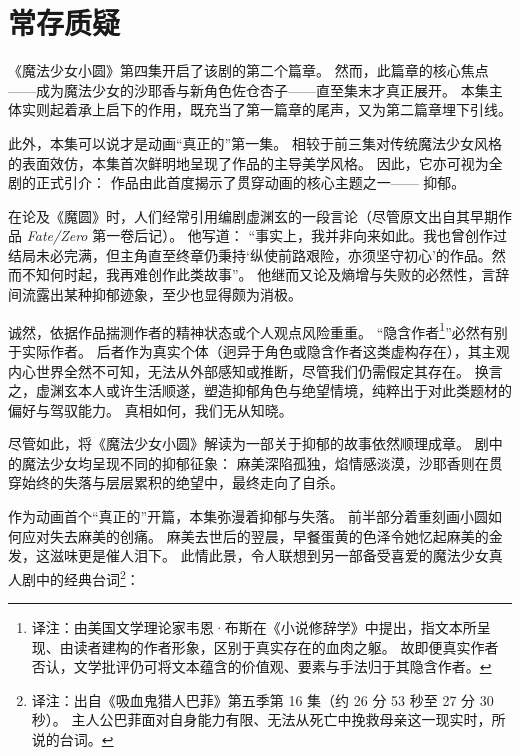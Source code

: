 \chapter[常存质疑]{常存质疑}



《魔法少女小圆》第四集开启了该剧的第二个篇章。
然而，此篇章的核心焦点——成为魔法少女的沙耶香与新角色佐仓杏子——直至集末才真正展开。
本集主体实则起着承上启下的作用，既充当了第一篇章的尾声，又为第二篇章埋下引线。

此外，本集可以说才是动画“真正的”第一集。
相较于前三集对传统魔法少女风格的表面效仿，本集首次鲜明地呈现了作品的主导美学风格。
因此，它亦可视为全剧的正式引介：
作品由此首度揭示了贯穿动画的核心主题之一——
抑郁。

在论及《魔圆》时，人们经常引用编剧虚渊玄的一段言论（尽管原文出自其早期作品 \emph{Fate/Zero} 第一卷后记）。
他写道：
“事实上，我并非向来如此。我也曾创作过结局未必完满，但主角直至终章仍秉持‘纵使前路艰险，亦须坚守初心’的作品。然而不知何时起，我再难创作此类故事”\cite{ref29}。
他继而又论及熵增与失败的必然性，言辞间流露出某种抑郁迹象，至少也显得颇为消极。

诚然，依据作品揣测作者的精神状态或个人观点风险重重。
“隐含作者\footnote{%
    译注：由美国文学理论家韦恩·布斯在《小说修辞学》中提出，指文本所呈现、由读者建构的作者形象，区别于真实存在的血肉之躯。
    故即便真实作者否认，文学批评仍可将文本蕴含的价值观、要素与手法归于其隐含作者。
}”必然有别于实际作者\cite{ref30}。
后者作为真实个体（迥异于角色或隐含作者这类虚构存在），其主观内心世界全然不可知，无法从外部感知或推断，尽管我们仍需假定其存在。
换言之，虚渊玄本人或许生活顺遂，塑造抑郁角色与绝望情境，纯粹出于对此类题材的偏好与驾驭能力。
真相如何，我们无从知晓。

尽管如此，将《魔法少女小圆》解读为一部关于抑郁的故事依然顺理成章。
剧中的魔法少女均呈现不同的抑郁征象：
麻美深陷孤独，焰情感淡漠，沙耶香则在贯穿始终的失落与层层累积的绝望中，最终走向了自杀。

作为动画首个“真正的”开篇，本集弥漫着抑郁与失落。
前半部分着重刻画小圆如何应对失去麻美的创痛。
麻美去世后的翌晨，早餐蛋黄的色泽令她忆起麻美的金发，这滋味更是催人泪下。
此情此景，令人联想到另一部备受喜爱的魔法少女真人剧中的经典台词\footnote{%
    译注：出自《吸血鬼猎人巴菲》第五季第 16 集（约 26 分 53 秒至 27 分 30 秒）。
    主人公巴菲面对自身能力有限、无法从死亡中挽救母亲这一现实时，所说的台词。
}：

